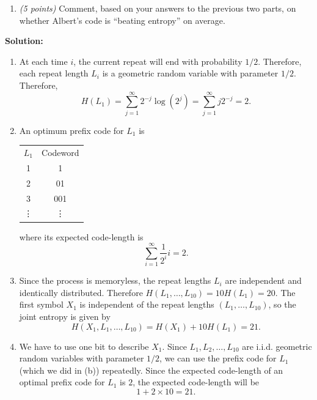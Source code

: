 \documentclass[12pt]{article}
\begin{document}
\begin{enumerate}
\begin{enumerate}
\item {\it (5 points)} Comment, based on your answers to the previous two parts, on whether Albert's code is  ``beating entropy'' on average.


\end{enumerate}


\vskip 0.2in
\begin{solution}
{\bf Solution:}\\
\begin{enumerate}
\item At each time $i$, the current repeat will end with probability $1/2$. 
Therefore, each repeat length $L_i$ is a geometric random variable with parameter $1/2$. Therefore, 
\[ H(L_1) = \sum_{j=1}^\infty 2^{-j} \log(2^j) = \sum_{j=1}^\infty j2^{-j} = 2 \mbox{.} \]

\item An optimum prefix code for $L_1$ is

\begin{tabular}{cc}
$L_1$ & Codeword  \\
1 & 1 \\
2 & 01\\
3 & 001\\
\vdots & \vdots
\end{tabular}
where its expected code-length is
\[\sum_{i=1}^{\infty} \frac{1}{2^i} i = 2.\]

\item Since the process is memoryless, the repeat lengths $L_i$ are independent and identically distributed. Therefore $H(L_1,\ldots,L_{10}) = 10 H(L_1) = 20$. 
The first symbol $X_1$ is independent of the repeat lengths $(L_1,\ldots,L_{10})$, so the joint entropy is given by
\[
H(X_1, L_1,\ldots,L_{10}) = H(X_1) + 10H(L_1) = 21 \mbox{.}
\]

\item We have to use one bit to describe $X_1$. Since $L_1,L_2,\ldots,L_{10}$ are i.i.d. geometric random variables with parameter $1/2$, we can use the prefix code for $L_1$ (which we did in (b)) repeatedly. Since the expected code-length of an optimal prefix code for $L_1$ is $2$, the expected code-length will be 
\[
1+2\times10 = 21.
\]


\end{enumerate}
\end{solution}
\end{enumerate}
\end{document}
